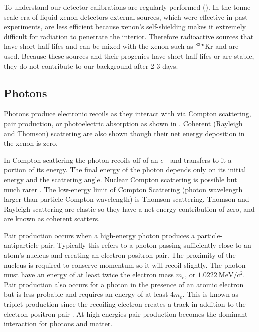 To understand our detector calibrations are regularly performed ().  In the tonne-scale era of liquid xenon
detectors external sources, which were effective in past experiments, are less efficient because xenon's self-shielding makes it extremely
difficult for radiation to penetrate the interior.  Therefore radioactive
sources that have short half-lifes and can be mixed with the xenon such as $\mathrm{^{83m}Kr}$ and \radoncal are used.  Because these
sources and their progenies have short half-lifes or are stable, they do not contribute to our background after 2-3 days.

\subsection{Photons}
\label{subsec:photons}
Photons produce electronic recoils as they interact with \electron via Compton scattering, pair production, or photoelectric absorption
as shown in .  Coherent (Rayleigh and Thomson) scattering are also shown though their net energy deposition in the
xenon is zero.

In Compton scattering the photon recoils off of an $e^{-}$ and transfers to it a portion of its energy.  The final energy of the photon
depends only on its initial energy and the scattering angle.  Nuclear Compton scattering is possible but much rarer
.  The low-energy limit of Compton Scattering (photon wavelength larger than particle Compton wavelength) is
Thomson scattering.  Thomson and Rayleigh scattering are elastic so they have a net energy contribution of zero, and are known as coherent
scatters.

Pair production occurs when a high-energy photon produces a particle-antiparticle pair.  Typically this refers to a photon passing
sufficiently
close to an atom's nucleus and creating an electron-positron pair.  The proximity of the nucleus is required to conserve momentum so it
will recoil slightly.  The photon must have an energy of at least twice the electron mass $m_{e}$, or $1.0222\ \mathrm{MeV/c^2}$.  Pair
production
also occurs for a photon in the presence of an atomic electron but is less probable and requires an energy of at least $4m_{e}$.  This
is known as triplet production since the recoiling electron creates a track in addition to the electron-positron pair
.  At high energies pair production becomes the dominant interaction for photons and matter.

